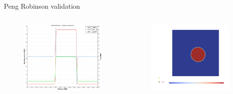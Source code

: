 \documentclass{beamer}
\begin{document}
	\begin{frame}{Peng Robinson validation}
		\begin{columns}
			\begin{figure}
				\centering
				\includegraphics[scale=0.12]{pics/prValidation.png}
				\caption{}   
			\end{figure}
			\begin{figure}
				\centering
				\includegraphics[scale=0.15]{pics/prValidation2.png}
			\end{figure}
		\end{columns}
	\end{frame}
\end{document}
